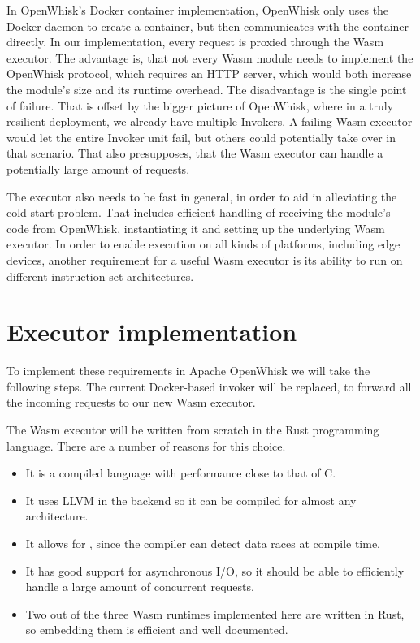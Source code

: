 
In OpenWhisk's Docker container implementation, OpenWhisk only uses the Docker daemon to create a container, but then communicates with the container directly. In our implementation, every request is proxied through the Wasm executor. The advantage is, that not every Wasm module needs to implement the OpenWhisk protocol, which requires an HTTP server, which would both increase the module's size and its runtime overhead. The disadvantage is the single point of failure. That is offset by the bigger picture of OpenWhisk, where in a truly resilient deployment, we already have multiple Invokers. A failing Wasm executor would let the entire Invoker unit fail, but others could potentially take over in that scenario. That also presupposes, that the Wasm executor can handle a potentially large amount of requests.

The executor also needs to be fast in general, in order to aid in alleviating the cold start problem. That includes efficient handling of receiving the module's code from OpenWhisk, instantiating it and setting up the underlying Wasm executor. In order to enable execution on all kinds of platforms, including edge devices, another requirement for a useful Wasm executor is its ability to run on different instruction set architectures.

\section{Executor implementation}


To implement these requirements in Apache OpenWhisk we will take the following steps. The current Docker-based invoker will be replaced, to forward all the incoming requests to our new Wasm executor.

The Wasm executor will be written from scratch in the Rust programming language. There are a number of reasons for this choice.

\begin{itemize}
    \item It is a compiled language with performance close to that of C.
    \item It uses LLVM in the backend so it can be compiled for almost any architecture.
    \item It allows for , since the compiler can detect data races at compile time.
    \item It has good support for asynchronous I/O, so it should be able to efficiently handle a large amount of concurrent requests.
    \item Two out of the three Wasm runtimes implemented here are written in Rust, so embedding them is efficient and well documented.
\end{itemize}


